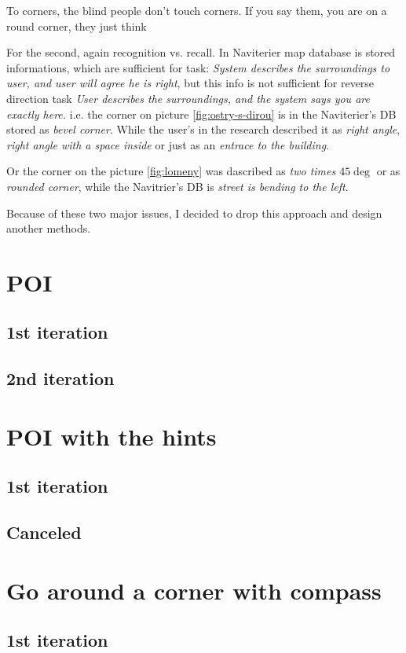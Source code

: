 				To corners, the blind people don't touch corners. If you say them, you are on a round corner, they just think 
				
				For the second, again recognition vs. recall. In Naviterier map database\cite{naviterier-map-details} is stored informations, which are sufficient for task: \emph{System describes the surroundings to user, and user will agree he is right}, but this info is not sufficient for reverse direction task \emph{User describes the surroundings, and the system says you are exactly here.} i.e. the corner on picture \ref{fig:ostry-s-dirou} is in the Naviterier's DB stored as \emph{bevel corner}. While the user's in the research described it as \emph{right angle}, \emph{right angle with a space inside} or just as an \emph{entrace to the building}.
				
				Or the corner on the picture \ref{fig:lomeny} was dascribed as \emph{two times $45\deg$} or as \emph{rounded corner}, while the Navitrier's DB is \emph{street is bending to the left}.
				
				Because of these two major issues, I decided to drop this approach and design another methods.
				
		\section{POI}		
			\subsection{1st iteration}
			\subsection{2nd iteration}		
		\section{POI with the hints}
			\subsection{1st iteration}
			\subsection{Canceled}	
		\section{Go around a corner with compass}
			\subsection{1st iteration}
